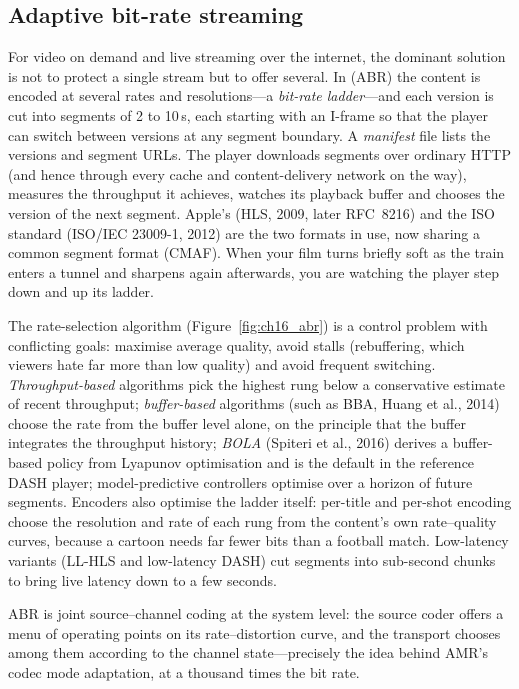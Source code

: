 \subsection{Adaptive bit-rate streaming}

For video on demand and live streaming over the internet, the dominant solution is not to protect a
single stream but to offer several. In  (ABR) the content is encoded at
several rates and resolutions---a \emph{bit-rate ladder}---and each version is cut into segments of 2 to
10\,s, each starting with an I-frame so that the player can switch between versions at any segment
boundary. A \emph{manifest} file lists the versions and segment URLs. The player downloads segments over
ordinary HTTP (and hence through every cache and content-delivery network on the way), measures the
throughput it achieves, watches its playback buffer and chooses the version of the next segment. Apple's
 (HLS, 2009, later RFC~8216) and the ISO standard  (ISO/IEC
23009-1, 2012) are the two formats in use, now sharing a common segment format (CMAF). When your
film turns briefly soft as the train enters a tunnel and sharpens again afterwards, you are watching
the player step down and up its ladder.

The rate-selection algorithm (Figure~\ref{fig:ch16_abr}) is a control problem with conflicting goals:
maximise average quality, avoid stalls (rebuffering, which viewers hate far more than low quality) and
avoid frequent switching. \emph{Throughput-based} algorithms pick the highest rung below a conservative
estimate of recent throughput; \emph{buffer-based} algorithms (such as BBA, Huang et al., 2014) choose the
rate from the buffer level alone, on the principle that the buffer integrates the throughput history;
\emph{BOLA} (Spiteri et al., 2016) derives a buffer-based policy from Lyapunov optimisation and is the
default in the reference DASH player; model-predictive controllers optimise over a horizon of future
segments. Encoders also optimise the ladder itself: per-title and per-shot encoding choose the
resolution and rate of each rung from the content's own rate--quality curves, because a cartoon needs far
fewer bits than a football match. Low-latency variants (LL-HLS and low-latency DASH) cut segments into
sub-second chunks to bring live latency down to a few seconds.

ABR is joint source--channel coding at the system level: the source coder offers a menu of operating
points on its rate--distortion curve, and the transport chooses among them according to the channel
state---precisely the idea behind AMR's codec mode adaptation, at a thousand times the bit rate.


